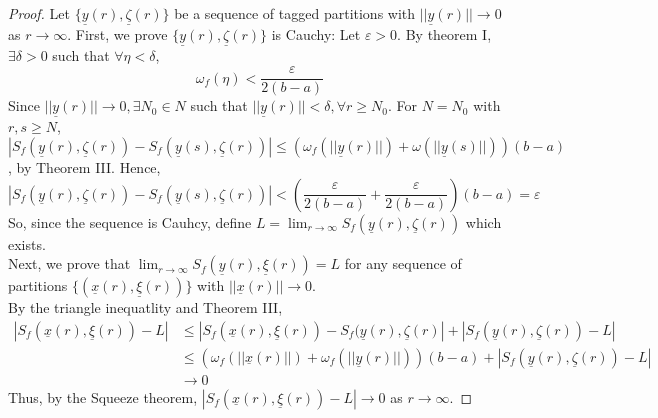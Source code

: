 \begin{proof}
    Let $\{\underline{y}(r), \underline{\zeta}(r)\}$ be a sequence of tagged partitions with $||\underline{y}(r)|| \to 0$ as $r \to \infty$.
    First, we prove $\{\underline{y}(r), \underline{\zeta}(r)\}$ is Cauchy: Let $\varepsilon > 0$. By theorem I, $\exists \delta>0$ such that $\forall \eta < \delta$,
    \begin{equation*}
        \omega_f(\eta) < \frac{\varepsilon}{2(b-a)}
    \end{equation*}
    Since $||\underline{y}(r)|| \to 0, \exists N_0 \in N$ such that $||\underline{y}(r)|| < \delta, \forall r \geq N_0$. For $N = N_0$ with $r,s \geq N$, $|S_f(\underline{y}(r), \underline{\zeta}(r)) - S_f(\underline{y}(s), \underline{\zeta}(r))| \leq (\omega_f(||\underline{y}(r)||) + \omega(||\underline{y}(s)||))(b-a)$, by Theorem III. Hence,
    \begin{equation*}
        |S_f(\underline{y}(r), \underline{\zeta}(r)) - S_f(\underline{y}(s), \underline{\zeta}(r))| < \left(
            \frac{\varepsilon}{2(b-a)} + \frac{\varepsilon}{2(b-a)}
        \right)(b-a) = \varepsilon
    \end{equation*}
    So, since the sequence is Cauhcy, define $L = \lim_{r \to \infty} S_f(\underline{y}(r), \underline{\zeta}(r))$ which exists. \\
    Next, we prove that $\lim_{r \to \infty} S_f(\underline{y}(r), \underline{\xi}(r)) = L$ for any sequence of partitions $\{(\underline{x}(r), \underline{\xi}(r))\}$ with $||\underline{x}(r)|| \to 0$. \\
    By the triangle inequatlity and Theorem III,
    \begin{align*}
        |S_f(\underline{x}(r), \underline{\xi}(r)) - L| &\leq |S_f(\underline{x}(r), \underline{\xi}(r)) - S_f(\underline{y}(r), \underline{\zeta}(r)| + |S_f(\underline{y}(r), \underline{\zeta}(r)) - L| \\
        &\leq (\omega_f(||\underline{x}(r)||) + \omega_f(||\underline{y}(r)||))(b-a) + |S_f(\underline{y}(r), \underline{\zeta}(r)) - L| \\
        &\to 0
    \end{align*}
    Thus, by the Squeeze theorem, $|S_f(\underline{x}(r), \underline{\xi}(r)) - L| \to 0$ as $r \to \infty$.
\end{proof}